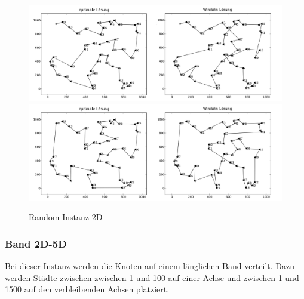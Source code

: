 \documentclass[11pt,a4paper]{article}
\begin{document}
\begin{figure}[H]
    \centering
    \includegraphics[width=16cm]{gfx/random_hpp_comparison}
    \includegraphics[width=16cm]{gfx/random_tsp_comparison}
    \caption{Random Instanz 2D}
    \label{img:random_comparison}
\end{figure}

\subsubsection{Band 2D-5D}
Bei dieser Instanz werden die Knoten auf einem länglichen Band verteilt. Dazu werden Städte zwischen zwischen 1 und 100 auf einer Achse und zwischen 1 und 1500 auf den verbleibenden Achsen platziert.
\end{document}
